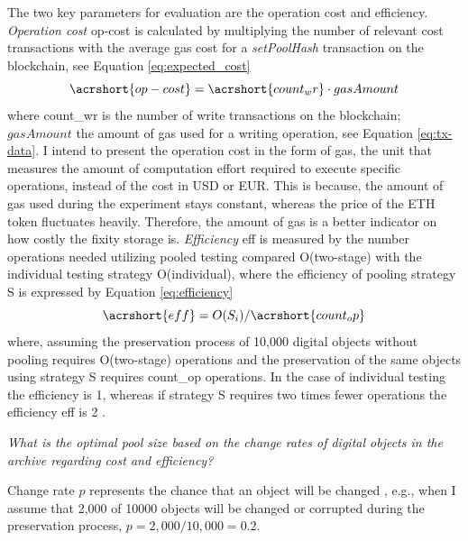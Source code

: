 The two key parameters for evaluation are the operation cost and efficiency. 
\textit{Operation cost} \acrshort{op-cost} is calculated by multiplying the number of relevant cost transactions with the average gas cost for a \textit{setPoolHash} transaction on the blockchain, see Equation \ref{eq:expected_cost}
\begin{equation}\label{eq:expected_cost}
    \acrshort{op-cost} = \acrshort{count_wr} \cdot gasAmount
\end{equation}
where \acrshort{count_wr} is the number of write transactions on the blockchain; $gasAmount$ the amount of gas used for a writing operation, see Equation \ref{eq:tx-data}.
I intend to present the operation cost in the form of gas, the unit that measures the amount of computation effort required to execute specific operations, instead of the cost in USD or EUR. This is because, the amount of gas used during the experiment stays constant, whereas the price of the ETH token fluctuates heavily. Therefore, the amount of gas is a better indicator on how costly the fixity storage is.
\textit{Efficiency} \acrshort{eff} is measured by the number operations needed utilizing pooled testing compared O(\acrshort{two-stage}) with the individual testing strategy O(\acrshort{individual}), where the efficiency of pooling strategy S is expressed by Equation \ref{eq:efficiency}
\begin{equation}\label{eq:efficiency}
    \acrshort{eff} = O(S_{i})/\acrshort{count_op}
\end{equation}
where, assuming the preservation process of 10,000 digital objects without pooling requires O(\acrshort{two-stage}) operations and the preservation of the same objects using strategy S requires \acrshort{count_op} operations. In the case of individual testing the efficiency is 1, whereas if strategy S requires two times fewer operations the efficiency \acrshort{eff} is 2 \cite[4]{vzilinskas2021pooled}.

\textit{What is the optimal pool size based on the change rates of digital objects in the archive regarding cost and efficiency?}

Change rate $p$ represents the chance that an object will be changed , e.g., when I assume that 2,000 of 10000 objects will be changed or corrupted during the preservation process, $p = 2,000/10,000 = 0.2$. 

